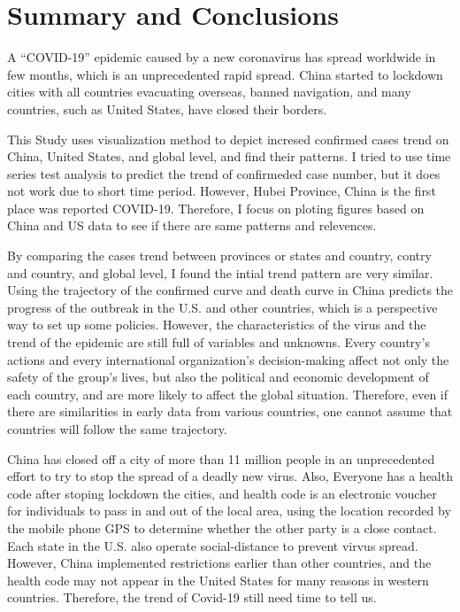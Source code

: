\documentclass[12pt,]{article}
\begin{document}
\newpage

\hypertarget{summary-and-conclusions}{%
\section{Summary and Conclusions}\label{summary-and-conclusions}}

A ``COVID-19'' epidemic caused by a new coronavirus has spread worldwide
in few months, which is an unprecedented rapid spread. China started to
lockdown cities with all countries evacuating overseas, banned
navigation, and many countries, such as United States, have closed their
borders.

This Study uses visualization method to depict incresed confirmed cases
trend on China, United States, and global level, and find their
patterns. I tried to use time series test analysis to predict the trend
of confirmeded case number, but it does not work due to short time
period. However, Hubei Province, China is the first place was reported
COVID-19. Therefore, I focus on ploting figures based on China and US
data to see if there are same patterns and relevences.

By comparing the cases trend between provinces or states and country,
contry and country, and global level, I found the intial trend pattern
are very similar. Using the trajectory of the confirmed curve and death
curve in China predicts the progress of the outbreak in the U.S. and
other countries, which is a perspective way to set up some policies.
However, the characteristics of the virus and the trend of the epidemic
are still full of variables and unknowns. Every country's actions and
every international organization's decision-making affect not only the
safety of the group's lives, but also the political and economic
development of each country, and are more likely to affect the global
situation. Therefore, even if there are similarities in early data from
various countries, one cannot assume that countries will follow the same
trajectory.

China has closed off a city of more than 11 million people in an
unprecedented effort to try to stop the spread of a deadly new virus.
Also, Everyone has a health code after stoping lockdown the cities, and
health code is an electronic voucher for individuals to pass in and out
of the local area, using the location recorded by the mobile phone GPS
to determine whether the other party is a close contact. Each state in
the U.S. also operate social-distance to prevent virvus spread. However,
China implemented restrictions earlier than other countries, and the
health code may not appear in the United States for many reasons in
western countries. Therefore, the trend of Covid-19 still need time to
tell us.
\end{document}
